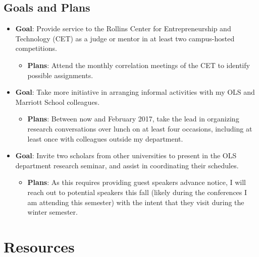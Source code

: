 \documentclass[11pt,article,oneside]{memoir}
\begin{document}
\subsection{Goals and Plans}\label{goals-and-plans-2}

\begin{itemize}
\tightlist
\item
  \textbf{Goal}: Provide service to the Rollins Center for
  Entrepreneurship and Technology (CET) as a judge or mentor in at least
  two campus-hosted competitions.

  \begin{itemize}
  \tightlist
  \item
    \textbf{Plans}: Attend the monthly correlation meetings of the CET
    to identify possible assignments.
  \end{itemize}
\item
  \textbf{Goal}: Take more initiative in arranging informal activities
  with my OLS and Marriott School colleagues.

  \begin{itemize}
  \tightlist
  \item
    \textbf{Plans}: Between now and February 2017, take the lead in
    organizing research conversations over lunch on at least four
    occasions, including at least once with colleagues outside my
    department.
  \end{itemize}
\item
  \textbf{Goal}: Invite two scholars from other universities to present
  in the OLS department research seminar, and assist in coordinating
  their schedules.

  \begin{itemize}
  \tightlist
  \item
    \textbf{Plans}: As this requires providing guest speakers advance
    notice, I will reach out to potential speakers this fall (likely
    during the conferences I am attending this semester) with the intent
    that they visit during the winter semester.
  \end{itemize}
\end{itemize}

\section{Resources}\label{resources}
\end{document}
